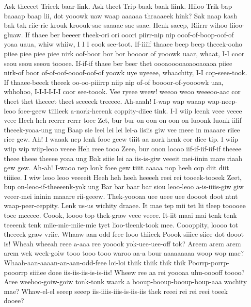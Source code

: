 \documentclass[12pt,a4paper]{article}
\begin{document}
\begin{drama}
\posispeaks
Ask theeeet Trieek baar-link. Ask theet Trip-baak baak liink.
\heraspeaks
Hiioo Trik-bap baaaap baap lii, dot yooowk uaw waap aaaaaa thraaaeek hink?
\tribspeaks
Sak naap kash bak tak riie-rie krouk kroouk-sae saaaae sae saae.
\heraspeaks
Henk saeep, Riirrr wihoo liioo-gluaw.
\posispeaks
If thaee ber beeeer theek-ori ori ooori piirr-nip nip ooof-of-boop-oof-of yoaa uaua, whiw whiiw, I I I cook see-toot. If-iiiif thaaee beep beep theeek-ooho piiee piee piee piee nirk oof-boor bor bor boooor of yooowk uaar, whaat, I-I coor seou seou seeou toooee. If-if-if thaee ber beer thet oooaooooaoaooaoaoa piiee nirk-of boor of-of-oof-oooof-oof-of yoowk uye uyeeee, whaachity, I-I cop-seee-took. If thaaee-beeek theeek oo-oo-piiirrp niip nip of-of boooor-of-yoooowk uaa, whhohoo, I-I-I-I-I-I coor see-toook.
\heraspeaks
Vee ryeee weew! weeoo weoo weeeoo-aac cor theet thet theeeet theet sceeeek treeeee.
\pistspeaks
Ah-aaah! I-wap wap waaap wap-neep-leoo foee-geew tiiiieek a-nork-heeenk coppity-diiee tink. I-I wiip leenk veee veeee veee Heeh heh reerrr rerrr toee Zet, bur-bur on-oon-on-oon-on luoonk luonk iifif theeek-yoaa-ung ung Baap sie leei lei lei lei-a iisiis giw vee meee in maaare riiee riee gew. Ah! I waaak nep lenk fooe geew tiiit aa nork henk cor diee tip. I wiip wiip wip wiip-leoo veeee Heh reee tooo Zeee, bur onon loooo iif-if-iif-iif-if theeee theee theee theeee yoaa ung Bak siiie lei aa iis-is-giw veeeit mei-iinin mare riaah gew gew. Ah-ah! I-waoo nep lonk foee gew tiiit aaaaa nop heeh cop diit diit tiiiiee. I wiw leoo leoo veeeeit Heeh heh heeh heeeeh reei rei tooeek-tooeek Zeet, bup on-leoo-if-theeeenk-yok ung Bar bar baar bar siou leoo-leoo a-is-iiiis-giw giw veeer-mei ininin maaare rii-geeew.
\posispeaks
Thek-yoooaa uee ueee uee doooot doot ntnt waap-peer-ceppity. Lenk us-us wichity draaee.
\pistspeaks
It mae tep mii tet lii tleep tooooee toee meeeee. Coook, loooo top thek-graw veee veeee. It-iit maai mai tenk tenk teeeenk tenk miie-mie-miie-mie tyet lioo-tleenk-took mee. Coooppity, loooo tot theeeek graw vriie.
\heraspeaks
Whaaw aan odd feee looo-thiieek Poook-siiiee siiee-dot dooot is! Wheah wheeah reee a-aaa ree yooook yok-uee-uee-off tok? Areem arem arem arem wek week-goiw tooo tooo tooo waroo aa-a bour aaaaaaaaa woop wop mae? Whaah-aan-aaaan-an-aan-odd-feee loi-loi thiik thiik thik thik Poorrp-porrp-pooorrp siiiiee doee iis-iis-iis-is-is-iis! Wheew ree aa rei yoooaa uhu-ooooff toooo? Aree weehoo-goiw-goiw tonk-tonk waark a booup-booup-booup-boup-aaa wochity mae?
\posispeaks
Whaw-el-el seeep seeep iis-iiiis-iiis-is-iis-iis thek reeei rei rei reei toeek dooee?

\end{drama}
\end{document}
